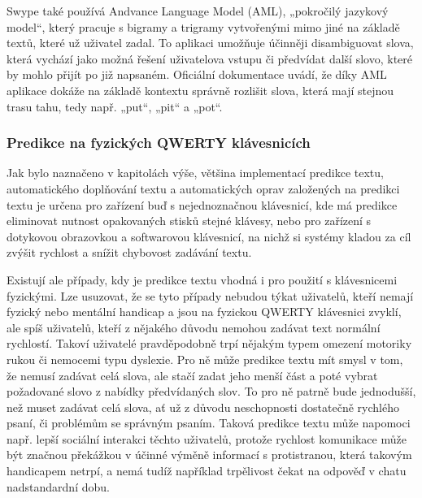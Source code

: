 \documentclass[a4paper,11pt]{article}
\begin{document}

Swype také používá Andvance Language Model (AML), „pokročilý jazykový model“, který pracuje s bigramy a trigramy vytvořenými mimo jiné na základě textů, které už uživatel zadal. To aplikaci umožňuje účinněji disambiguovat slova, která vychází jako možná řešení uživatelova vstupu či předvídat další slovo, které by mohlo přijít po již napsaném. Oficiální dokumentace uvádí, že díky AML aplikace dokáže na základě kontextu správně rozlišit slova, která mají stejnou trasu tahu, tedy např. „put“, „pit“ a „pot“.

\subsubsection{Predikce na fyzických QWERTY klávesnicích}

Jak bylo naznačeno v kapitolách výše, většina implementací predikce textu, automatického doplňování textu a automatických oprav založených na predikci textu je určena pro zařízení buď s nejednoznačnou klávesnicí, kde má predikce eliminovat nutnost opakovaných stisků stejné klávesy, nebo pro zařízení s dotykovou obrazovkou a softwarovou klávesnicí, na nichž si systémy kladou za cíl zvýšit rychlost a snížit chybovost zadávání textu. 

Existují ale případy, kdy je predikce textu vhodná i pro použití s klávesnicemi fyzickými. Lze usuzovat, že se tyto případy nebudou týkat uživatelů, kteří nemají fyzický nebo mentální handicap a jsou na fyzickou QWERTY klávesnici zvyklí, ale spíš uživatelů, kteří z nějakého důvodu nemohou zadávat text normální rychlostí. Takoví uživatelé pravděpodobně trpí nějakým typem omezení motoriky rukou či nemocemi typu dyslexie. Pro ně může predikce textu mít smysl v tom, že nemusí zadávat celá slova, ale stačí zadat jeho menší část a poté vybrat požadované slovo z nabídky předvídaných slov. To pro ně patrně bude jednodušší, než muset zadávat celá slova, ať už z důvodu neschopnosti dostatečně rychlého psaní, či problémům se správným psaním. %
Taková predikce textu může napomoci např. lepší sociální interakci těchto uživatelů, protože rychlost komunikace může být značnou překážkou v účinné výměně informací s protistranou, která takovým handicapem netrpí, a nemá tudíž například trpělivost čekat na odpověď v chatu nadstandardní dobu. %
\end{document}
